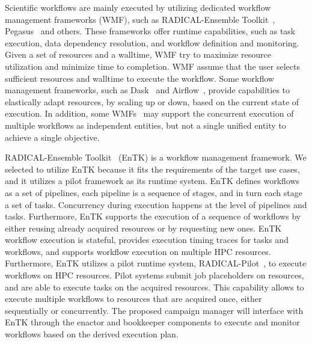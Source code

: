 Scientific workflows are mainly executed by utilizing dedicated workflow management frameworks (WMF), such as RADICAL-Ensemble Toolkit~\cite{balasubramanian2018harnessing}, Pegasus~\cite{deelman2015pegasus} and others.
These frameworks offer runtime capabilities, such as task execution, data dependency resolution, and workflow definition and monitoring.
Given a set of resources and a walltime, WMF try to maximize resource utilization and minimize time to completion.
WMF assume that the user selects sufficient resources and walltime to execute the workflow.
Some workflow management frameworks, such as Dask~\cite{rocklin2015dask} and Airflow~\cite{airflow}, provide capabilities to elastically adapt resources, by scaling up or down, based on the current state of execution.
In addition, some  WMFs~\cite{deelman2015pegasus} may support the concurrent execution of multiple workflows as independent entities, but not a single unified entity to achieve a single objective.

RADICAL-Ensemble Toolkit~\cite{balasubramanian2018harnessing} (EnTK) is a workflow management framework.
We selected to utilize EnTK because it fits the requirements of the target use cases, and it utilizes a pilot framework as its runtime system.
EnTK defines workflows as a set of pipelines, each pipeline is a sequence of stages, and in turn each stage a set of tasks.
Concurrency during execution happens at the level of pipelines and tasks.
Furthermore, EnTK supports the execution of a sequence of workflows by either reusing already acquired resources or by requesting new ones.
EnTK workflow execution is stateful, provides execution timing traces for tasks and workflows, and supports workflow execution on multiple HPC resources.
Furthermore, EnTK utilizes a pilot runtime system, RADICAL-Pilot~\cite{merzky2019using}, to execute workflows on HPC resources.
Pilot systems submit job placeholders on resources, and are able to execute tasks on the acquired resources.
This capability allows to execute multiple workflows to resources that are acquired once, either sequentially or concurrently.
The proposed campaign manager will interface with EnTK through the enactor and bookkeeper components to execute and monitor workflows based on the derived execution plan.

